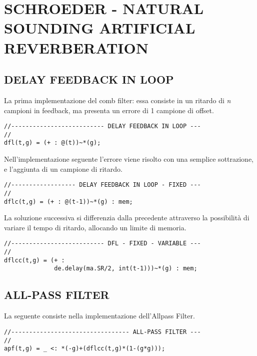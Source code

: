 \section*{SCHROEDER - NATURAL SOUNDING ARTIFICIAL REVERBERATION}

\subsection*{DELAY FEEDBACK IN LOOP}

La prima implementazione del comb filter: essa consiste in un ritardo di
\textit{n} campioni in feedback, ma presenta un errore di 1 campione di
offset.

\begin{lstlisting}
//-------------------------- DELAY FEEDBACK IN LOOP ---
//
dfl(t,g) = (+ : @(t))~*(g);
\end{lstlisting}

Nell'implementazione seguente l'errore viene risolto con una semplice
sottrazione, e l'aggiunta di un campione di ritardo.

\begin{lstlisting}
//------------------ DELAY FEEDBACK IN LOOP - FIXED ---
//
dflc(t,g) = (+ : @(t-1))~*(g) : mem;
\end{lstlisting}

La soluzione successiva si differenzia dalla precedente attraverso la
possibilità di variare il tempo di ritardo, allocando un limite di memoria.

\begin{lstlisting}
//-------------------------- DFL - FIXED - VARIABLE ---
//
dflcc(t,g) = (+ :
              de.delay(ma.SR/2, int(t-1)))~*(g) : mem;
\end{lstlisting}

\subsection*{ALL-PASS FILTER}

La seguente consiste nella implementazione dell'Allpass Filter.
\begin{lstlisting}
//--------------------------------- ALL-PASS FILTER ---
//
apf(t,g) = _ <: *(-g)+(dflcc(t,g)*(1-(g*g)));
\end{lstlisting}

